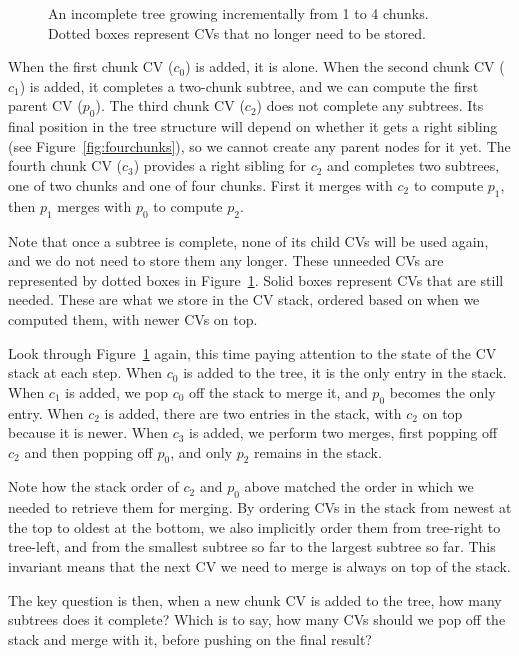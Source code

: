 \documentclass[11pt,notitlepage,a4paper]{article}
\begin{document}
\begin{figure}[h]
\centering

\caption{An incomplete tree growing incrementally from 1 to 4 chunks. Dotted
    boxes represent CVs that no longer need to be stored.}
\label{fig:incrementaltrees}
\end{figure}

When the first chunk CV ($c_0$) is added, it is alone. When the second chunk CV
($c_1$) is added, it completes a two-chunk subtree, and we can compute the
first parent CV ($p_0$). The third chunk CV ($c_2$) does not complete any
subtrees. Its final position in the tree structure will depend on whether it
gets a right sibling (see Figure~\ref{fig:fourchunks}), so we cannot create any
parent nodes for it yet. The fourth chunk CV ($c_3$) provides a right sibling
for $c_2$ and completes two subtrees, one of two chunks and one of four chunks.
First it merges with $c_2$ to compute $p_1$, then $p_1$ merges with $p_0$ to
compute $p_2$.

Note that once a subtree is complete, none of its child CVs will be used again,
and we do not need to store them any longer. These unneeded CVs are represented
by dotted boxes in Figure~\ref{fig:incrementaltrees}. Solid boxes represent CVs
that are still needed. These are what we store in the CV stack, ordered based
on when we computed them, with newer CVs on top.

Look through Figure~\ref{fig:incrementaltrees} again, this time paying
attention to the state of the CV stack at each step. When $c_0$ is added to the
tree, it is the only entry in the stack. When $c_1$ is added, we pop $c_0$ off
the stack to merge it, and $p_0$ becomes the only entry. When $c_2$ is added,
there are two entries in the stack, with $c_2$ on top because it is newer. When
$c_3$ is added, we perform two merges, first popping off $c_2$ and then popping
off $p_0$, and only $p_2$ remains in the stack.

Note how the stack order of $c_2$ and $p_0$ above matched the order in which we
needed to retrieve them for merging. By ordering CVs in the stack from newest
at the top to oldest at the bottom, we also implicitly order them from
tree-right to tree-left, and from the smallest subtree so far to the largest
subtree so far. This invariant means that the next CV we need to merge is
always on top of the stack.

The key question is then, when a new chunk CV is added to the tree, how many
subtrees does it complete? Which is to say, how many CVs should we pop off the
stack and merge with it, before pushing on the final result?
\end{document}
